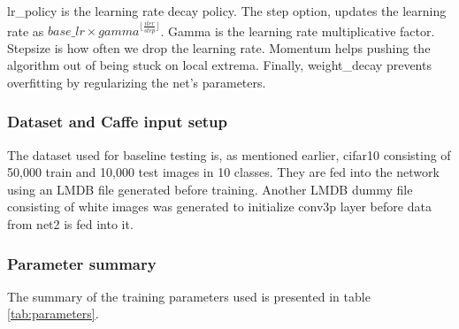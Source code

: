\documentclass[a4paper, 12pt]{article}
\numberwithin{equation}{section}
\begin{document}
	lr\_policy is the learning rate decay policy. The step option, updates the learning rate as $base\_lr \times gamma ^ {\lfloor \frac{iter}{step} \rfloor}$. Gamma is the learning rate multiplicative factor. Stepsize is how often we drop the learning rate. Momentum helps pushing the algorithm out of being stuck on local extrema. Finally, weight\_decay prevents overfitting by regularizing the net's parameters.


	\subsubsection{Dataset and Caffe input setup}

	The dataset used for baseline testing is, as mentioned earlier, cifar10 consisting of 50,000 train and 10,000 test images in 10 classes. They are fed into the network using an LMDB file generated before training. Another LMDB dummy file consisting of white images was generated to initialize conv3p layer before data from net2 is fed into it.

	\subsubsection{Parameter summary}

	The summary of the training parameters used is presented in table \ref{tab:parameters}.
\end{document}
